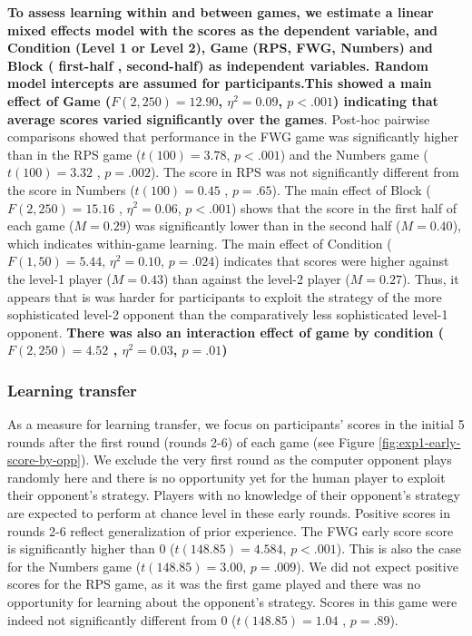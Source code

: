 \documentclass[english,man,floatsintext]{apa6}
\begin{document}
\textbf{To assess learning within and between games, we estimate a linear mixed effects model with the scores as the dependent variable, and Condition (Level 1 or Level 2), Game (RPS, FWG, Numbers) and Block ( first-half , second-half) as independent variables. Random model intercepts are assumed for participants.This showed a main effect of Game (\(F(2,250) = 12.90\), \(\eta^{2} = 0.09\), \(p < .001\)) indicating that average scores varied significantly over the games}. Post-hoc pairwise comparisons showed that performance in the FWG game was significantly higher than in the RPS game (\(t(100) =3.78\), \(p < .001\)) and the Numbers game (\(t(100) = 3.32\) , \(p = .002\)). The score in RPS was not significantly different from the score in Numbers (\(t(100) = 0.45\) , \(p = .65\)). The main effect of Block (\(F(2,250) = 15.16\) , \(\eta^{2} = 0.06\), \(p < .001\)) shows that the score in the first half of each game (\(M = 0.29\)) was significantly lower than in the second half (\(M = 0.40\)), which indicates within-game learning. The main effect of Condition (\(F(1,50) = 5.44\), \(\eta^{2} = 0.10\), \(p = .024\)) indicates that scores were higher against the level-1 player (\(M = 0.43\)) than against the level-2 player (\(M = 0.27\)). Thus, it appears that is was harder for participants to exploit the strategy of the more sophisticated level-2 opponent than the comparatively less sophisticated level-1 opponent. \textbf{There was also an interaction effect of game by condition (\(F(2,250) = 4.52\) , \(\eta^{2} = 0.03\), \(p = .01\))}

\hypertarget{learning-transfer}{%
\subsubsection{Learning transfer}\label{learning-transfer}}

As a measure for learning transfer, we focus on participants' scores in the initial 5 rounds after the first round (rounds 2-6) of each game (see Figure \ref{fig:exp1-early-score-by-opp}). We exclude the very first round as the computer opponent plays randomly here and there is no opportunity yet for the human player to exploit their opponent's strategy. Players with no knowledge of their opponent's strategy are expected to perform at chance level in these early rounds. Positive scores in rounds 2-6 reflect generalization of prior experience. The FWG early score score is significantly higher than 0 (\(t(148.85) = 4.584\), \(p < .001\)). This is also the case for the Numbers game (\(t(148.85) = 3.00\), \(p = .009\)). We did not expect positive scores for the RPS game, as it was the first game played and there was no opportunity for learning about the opponent's strategy. Scores in this game were indeed not significantly different from 0 (\(t(148.85) = 1.04\) , \(p = .89\)).
\end{document}
